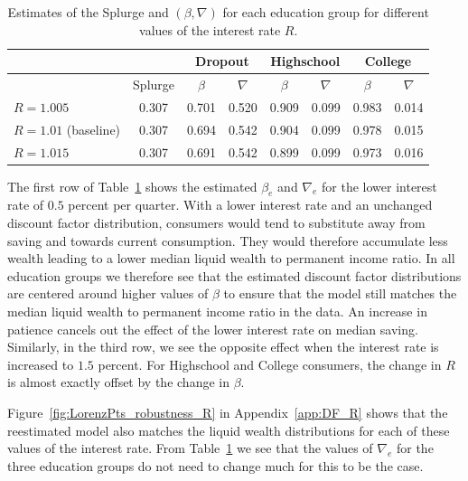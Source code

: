\documentclass[../HAFiscal]{subfiles}
\begin{document}
\begin{table}[t]
\begin{center}
	\begin{tabular}{lc|cccccc} 
		\toprule
		& & \multicolumn{2}{c}{Dropout} & \multicolumn{2}{c}{Highschool} & \multicolumn{2}{c}{College} \\ \midrule 
		& Splurge & $\beta$ & $\nabla$ & $\beta$ & $\nabla$ & $\beta$ & $\nabla$ \\ \midrule 
		$R = 1.005$ & 0.307 & 0.701 & 0.520 & 0.909 & 0.099 & 0.983 & 0.014 \\
		$R = 1.01$ (baseline) & 0.307 & 0.694 & 0.542 & 0.904 & 0.099 & 0.978 & 0.015 \\ 
		$R = 1.015$ & 0.307 & 0.691 & 0.542 & 0.899 & 0.099 & 0.973 & 0.016 
		\\ \bottomrule 
	\end{tabular}
\caption{Estimates of the Splurge and $(\beta,\nabla)$ for each education group for different values of the interest rate $R$.}
\label{tab:robustness_R}
\end{center}
\end{table}

The first row of Table~\ref{tab:robustness_R} shows the estimated $\beta_e$ and $\nabla_e$ for the lower interest rate of $0.5$ percent per quarter. With a lower interest rate and an unchanged discount factor distribution, consumers would tend to substitute away from saving and towards current consumption. They would therefore accumulate less wealth leading to a lower median liquid wealth to permanent income ratio. In all education groups we therefore see that the estimated discount factor distributions are centered around higher values of $\beta$ to ensure that the model still matches the median liquid wealth to permanent income ratio in the data. An increase in patience cancels out the effect of the lower interest rate on median saving. Similarly, in the third row, we see the opposite effect when the interest rate is increased to $1.5$ percent. For Highschool and College consumers, the change in $R$ is almost exactly offset by the change in $\beta$.  

Figure~\ref{fig:LorenzPts_robustness_R} in Appendix~\ref{app:DF_R} shows that the reestimated model also matches the liquid wealth distributions for each of these values of the interest rate. From Table~\ref{tab:robustness_R} we see that the values of $\nabla_e$ for the three education groups do not need to change much for this to be the case. 

\FloatBarrier
\end{document}
